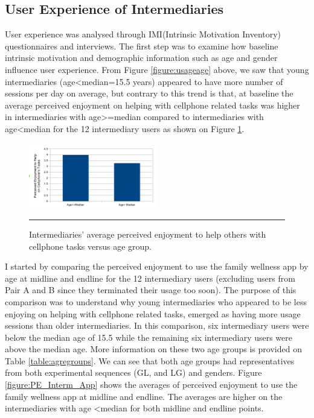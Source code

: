 \subsection{User Experience of Intermediaries}
User experience was analysed through IMI(Intrinsic Motivation Inventory) questionnaires and interviews. The first step was to examine how baseline intrinsic motivation and  demographic information such as age and gender influence user experience. From Figure \ref{figure:usageage} above, we saw that young intermediaries (age\textless median=15.5 years) appeared to have more number of sessions per day on average, but contrary to this trend is that, at baseline the average perceived enjoyment on helping with cellphone related tasks was higher in intermediaries with age\textgreater=median compared to intermediaries with age\textless median for the 12 intermediary users as shown on Figure \ref{figure:PE_HELP_Age}. 
\begin{figure}[htbp]
  \centering
    \includegraphics[width=0.5\textwidth]{Figures/PE_HELP_Age.png}
    \rule{35em}{0.5pt}
  \caption{Intermediaries' average perceived enjoyment to help others with cellphone tasks versus age group.}
  \label{figure:PE_HELP_Age}
\end{figure}\newline
I started by comparing the perceived enjoyment to use the family wellness app by age at midline and endline for the 12 intermediary users (excluding users from Pair A and B since they terminated their usage too soon). The purpose of this comparison was to understand why young intermediaries who appeared to be less enjoying on helping with cellphone related tasks, emerged as having more usage sessions than older intermediaries. In this comparison, six intermediary users were below the median age of 15.5 while the remaining six intermediary users were above the median age. More information on these two age groups is provided on Table \ref{table:agregroups}. We can see that both age groups had representatives from both experimental sequences (GL, and LG)  and genders. Figure \ref{figure:PE_Interm_App} shows the averages of perceived enjoyment to use the family wellness app at midline and endline. The averages are higher on the intermediaries with age \textless median for both midline and endline points. \newline
